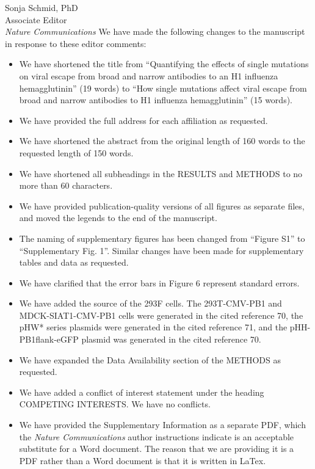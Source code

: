\documentclass[a4paper,11pt]{letter}
\begin{document}
\begin{letter}{Sonja Schmid, PhD \\ Associate Editor \\ \textit{Nature Communications} }
We have made the following changes to the manuscript in response to these editor comments:
\begin{itemize}

\item We have shortened the title from ``Quantifying the effects of single mutations on viral escape from broad and narrow antibodies to an H1 influenza hemagglutinin'' (19 words) to ``How single mutations affect viral escape from broad and narrow antibodies to H1 influenza hemagglutinin'' (15 words). 

\item We have provided the full address for each affiliation as requested.

\item We have shortened the abstract from the original length of 160 words to the requested length of 150 words.

\item We have shortened all subheadings in the RESULTS and METHODS to no more than 60 characters.

\item We have provided publication-quality versions of all figures as separate files, and moved the legends to the end of the manuscript.

\item The naming of supplementary figures has been changed from ``Figure S1'' to ``Supplementary Fig. 1''. Similar changes have been made for supplementary tables and data as requested.

\item We have clarified that the error bars in Figure 6 represent standard errors.

\item We have added the source of the 293F cells. The 293T-CMV-PB1 and MDCK-SIAT1-CMV-PB1 cells were generated in the cited reference 70, the pHW* series plasmids were generated in the cited reference 71, and the pHH-PB1flank-eGFP plasmid was generated in the cited reference 70.

\item We have expanded the Data Availability section of the METHODS as requested. 

\item We have added a conflict of interest statement under the heading COMPETING INTERESTS. We have no conflicts.

\item We have provided the Supplementary Information as a separate PDF, which the \textit{Nature Communications} author instructions indicate is an acceptable substitute for a Word document. The reason that we are providing it is a PDF rather than a Word document is that it is written in LaTex. 


\end{itemize}
\end{letter}
\end{document}
